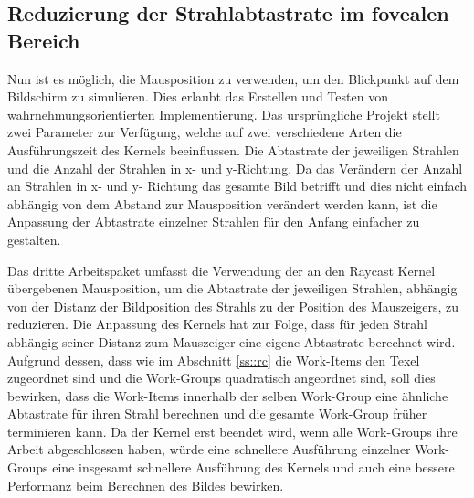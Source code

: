 \subsection{Reduzierung der Strahlabtastrate im fovealen Bereich}\label{sec::workpacks::ors}
Nun ist es möglich, die Mausposition zu verwenden, um den Blickpunkt auf dem Bildschirm zu simulieren.
Dies erlaubt das Erstellen und Testen von wahrnehmungsorientierten Implementierung. 
Das ursprüngliche Projekt stellt zwei Parameter zur Verfügung, welche auf zwei verschiedene Arten die Ausführungszeit des Kernels beeinflussen.
Die Abtastrate der jeweiligen Strahlen und die Anzahl der Strahlen in x- und y-Richtung.
Da das Verändern der Anzahl an Strahlen in x- und y- Richtung das gesamte Bild betrifft und dies nicht einfach abhängig von dem Abstand zur Mausposition verändert werden kann, ist die Anpassung der Abtastrate einzelner Strahlen für den Anfang einfacher zu gestalten.

Das dritte Arbeitspaket umfasst die Verwendung der an den Raycast Kernel übergebenen Mausposition, um die Abtastrate der jeweiligen Strahlen, abhängig von der Distanz der Bildposition des Strahls zu der Position des Mauszeigers, zu reduzieren.
Die Anpassung des Kernels hat zur Folge, dass für jeden Strahl abhängig seiner Distanz zum Mauszeiger eine eigene Abtastrate berechnet wird.
Aufgrund dessen, dass wie im Abschnitt \ref{ss::rc} die Work-Items den Texel zugeordnet sind und die Work-Groups quadratisch angeordnet sind, soll dies bewirken, dass die Work-Items innerhalb der selben Work-Group eine ähnliche Abtastrate für ihren Strahl berechnen und die gesamte Work-Group früher terminieren kann.
Da der Kernel erst beendet wird, wenn alle Work-Groups ihre Arbeit abgeschlossen haben, würde eine schnellere Ausführung einzelner Work-Groups eine insgesamt schnellere Ausführung des Kernels und auch eine bessere Performanz beim Berechnen des Bildes bewirken.


